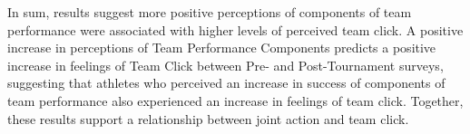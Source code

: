 \begin{CJK}{UTF8}{gbsn}
In sum, results suggest more positive perceptions of components of team performance were associated with higher levels of perceived team click. A positive increase in perceptions of Team Performance Components predicts a positive increase in feelings of Team Click between Pre- and Post-Tournament surveys, suggesting that athletes who perceived an increase in success of components of team performance also experienced an increase in feelings of team click. Together, these results support a relationship between joint action and team click.











\end{CJK}
